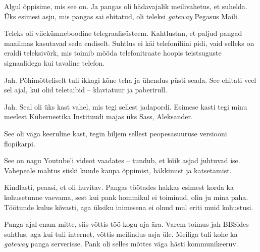 
Algul õppisime, mis see on. Ja pangas oli hädavajalik meilivahetus, et suhelda. Üks esimesi asju, mis pangas sai 
ehitatud, oli teleksi \emph{gateway} Pegasus Maili. 


Teleks oli viiekümneboodine  telegraafisüsteem. Kahtlustan, et paljud pangad maailmas kasutavad seda endiselt. Suhtlus ei käi telefoniliini 
pidi, vaid selleks on eraldi teleksivõrk, mis toimib mööda telefonitraate 
hoopis teistsuguste signaalidega kui tavaline telefon.


Jah. Põhimõtteliselt tuli ikkagi kõne teha ja ühendus püsti seada. 
See ehitati veel sel ajal, kui olid teletaibid -- klaviatuur ja 
paberirull.


Jah. Seal oli üks kast vahel, mis tegi sellest jadapordi. Esimese kasti tegi minu meelest
Küberneetika Instituudi majas üks Sass, Aleksander.

See oli väga keeruline kast, tegin hiljem sellest peopesasuuruse 
versiooni flopikarpi.


See on nagu Youtube'i videot vaadates -- tundub, et kõik asjad juhtuvad ise. 
Vahepeale mahtus siiski kuude kaupa õppimist, häkkimist ja katsetamist.


Kindlasti, peaasi, et oli huvitav. 
Pangas töötades hakkas esimest korda ka kohusetunne vaevama, sest kui pank hommikul ei toiminud, olin ju mina paha.
Töötunde kulus kõvasti, aga üksiku inimesena ei olnud mul eriti muid kohustusi.


Panga ajal enam mitte, siis võttis töö kogu aja ära. Varem toimus jah BBSides suhtlus, aga kui tuli internet, võttis meilindus asja üle. Meiliga tuli kohe ka  \emph{gateway} 
 panga serverisse. Pank oli selles mõttes väga hästi kommunikeeruv.

